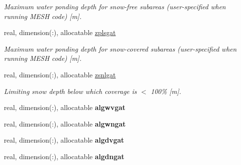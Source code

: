 \begin{DoxyCompactItemize}
\begin{DoxyCompactList}\small\item\em Maximum water ponding depth for snow-\/free subareas (user-\/specified when running M\+E\+S\+H code) \mbox{[}m\mbox{]}. \end{DoxyCompactList}\item 
\hypertarget{structclass__statevars_1_1class__gather_afd0af8b665b6eaaccf97ca234abdb088}{}real, dimension(\+:), allocatable \hyperlink{structclass__statevars_1_1class__gather_afd0af8b665b6eaaccf97ca234abdb088}{zplsgat}\label{structclass__statevars_1_1class__gather_afd0af8b665b6eaaccf97ca234abdb088}

\begin{DoxyCompactList}\small\item\em Maximum water ponding depth for snow-\/covered subareas (user-\/specified when running M\+E\+S\+H code) \mbox{[}m\mbox{]}. \end{DoxyCompactList}\item 
\hypertarget{structclass__statevars_1_1class__gather_a7067f9d561c2d5b07e1ec978f367ac13}{}real, dimension(\+:), allocatable \hyperlink{structclass__statevars_1_1class__gather_a7067f9d561c2d5b07e1ec978f367ac13}{zsnlgat}\label{structclass__statevars_1_1class__gather_a7067f9d561c2d5b07e1ec978f367ac13}

\begin{DoxyCompactList}\small\item\em Limiting snow depth below which coverage is $<$ 100\% \mbox{[}m\mbox{]}. \end{DoxyCompactList}\item 
\hypertarget{structclass__statevars_1_1class__gather_a6a7fa42b683c1529754a81623dfc3214}{}real, dimension(\+:), allocatable {\bfseries algwvgat}\label{structclass__statevars_1_1class__gather_a6a7fa42b683c1529754a81623dfc3214}

\item 
\hypertarget{structclass__statevars_1_1class__gather_af5b81c164e0361c8538950d6fd53e903}{}real, dimension(\+:), allocatable {\bfseries algwngat}\label{structclass__statevars_1_1class__gather_af5b81c164e0361c8538950d6fd53e903}

\item 
\hypertarget{structclass__statevars_1_1class__gather_a271d739261c26dd0dda0173f815700ac}{}real, dimension(\+:), allocatable {\bfseries algdvgat}\label{structclass__statevars_1_1class__gather_a271d739261c26dd0dda0173f815700ac}

\item 
\hypertarget{structclass__statevars_1_1class__gather_ac1dd95cb0050fe3e98f65d9c69c48c1f}{}real, dimension(\+:), allocatable {\bfseries algdngat}\label{structclass__statevars_1_1class__gather_ac1dd95cb0050fe3e98f65d9c69c48c1f}


\end{DoxyCompactItemize}
